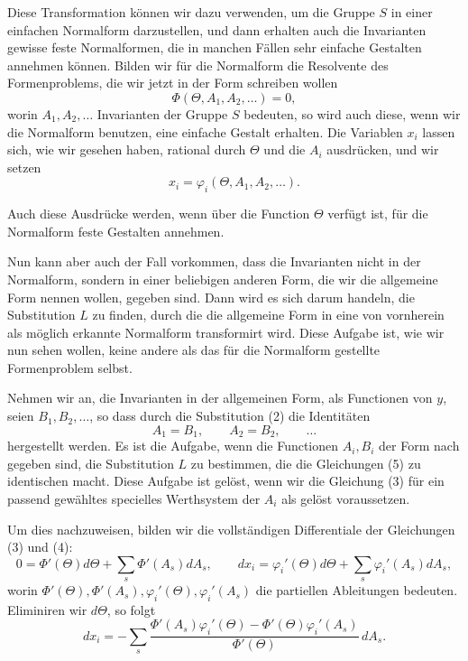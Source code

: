 \documentclass[11pt]{article}
\begin{document}
Diese Transformation können wir dazu verwenden, um die Gruppe $S$ in einer einfachen Normalform darzustellen, und dann erhalten auch die Invarianten gewisse feste Normalformen, die in manchen Fällen sehr einfache Gestalten annehmen können. Bilden wir für die Normalform die Resolvente des Formenproblems, die wir jetzt in der Form schreiben wollen
\begin{equation}
\Phi(\Theta,A_1,A_2,\ldots)=0,
\tag{3}
\end{equation}
worin $A_1,A_2,\ldots$ Invarianten der Gruppe $S$ bedeuten, so wird auch diese, wenn wir die Normalform benutzen, eine einfache Gestalt erhalten. Die Variablen $x_i$ lassen sich, wie wir gesehen haben, rational durch $\Theta$ und die $A_i$ ausdrücken, und wir setzen
\begin{equation}
x_i=\varphi_i(\Theta,A_1,A_2,\ldots).
\tag{4}
\end{equation}

Auch diese Ausdrücke werden, wenn über die Function $\Theta$ verfügt ist, für die Normalform feste Gestalten annehmen.

Nun kann aber auch der Fall vorkommen, dass die Invarianten nicht in der Normalform, sondern in einer beliebigen anderen Form, die wir die allgemeine Form nennen wollen, gegeben sind. Dann wird es sich darum handeln, die Substitution $L$ zu finden, durch die die allgemeine Form in eine von vornherein als möglich erkannte Normalform transformirt wird. Diese Aufgabe ist, wie wir nun sehen wollen, keine andere als das für die Normalform gestellte Formenproblem selbst.

Nehmen wir an, die Invarianten in der allgemeinen Form, als Functionen von $y$, seien $B_1,B_2,\ldots$, so dass durch die Substitution (2) die Identitäten
\begin{equation}
A_1=B_1,\qquad A_2=B_2,\qquad \ldots
\tag{5}
\end{equation}
hergestellt werden. Es ist die Aufgabe, wenn die Functionen $A_i,B_i$ der Form nach gegeben sind, die Substitution $L$ zu bestimmen, die die Gleichungen (5) zu identischen macht. Diese Aufgabe ist gelöst, wenn wir die Gleichung (3) für ein passend gewähltes specielles Werthsystem der $A_i$ als gelöst voraussetzen.

Um dies nachzuweisen, bilden wir die vollständigen Differentiale der Gleichungen (3) und (4):
\[
0=\Phi'(\Theta)d\Theta+\sum_s \Phi'(A_s)dA_s,
\qquad
dx_i=\varphi_i'(\Theta)d\Theta+\sum_s\varphi_i'(A_s)dA_s,
\]
worin $\Phi'(\Theta),\Phi'(A_s),\varphi_i'(\Theta),\varphi_i'(A_s)$ die partiellen Ableitungen bedeuten. Eliminiren wir $d\Theta$, so folgt
\begin{equation}
dx_i=-\sum_s\frac{\Phi'(A_s)\varphi_i'(\Theta)-\Phi'(\Theta)\varphi_i'(A_s)}{\Phi'(\Theta)}\,dA_s.
\tag{6}
\end{equation}
\end{document}
